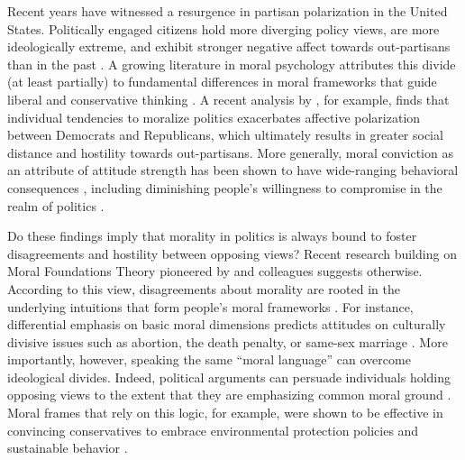 Recent years have witnessed a resurgence in partisan polarization in the United States. Politically engaged citizens hold more diverging policy
views, are more ideologically extreme, and exhibit stronger negative affect towards out-partisans than in the past \citep{hetherington2001resurgent, abramowitz2008polarization, iyengar2012affect, mason2014disrespectfully, huddy2015expressive, iyengar2015fear}. A growing literature in moral psychology attributes this divide (at least partially) to fundamental differences in moral frameworks that guide liberal and conservative thinking \citep[e.g.,][]{haidt2012righteous,graham2013moral}. A recent analysis by \citet{garrett2018moral}, for example, finds that individual tendencies to moralize politics exacerbates affective polarization between Democrats and Republicans, which ultimately results in greater social distance and hostility towards out-partisans. More generally, moral conviction as an attribute of attitude strength has been shown to have wide-ranging behavioral consequences \citep{skitka2005moral,skitka2014social}, including diminishing people's willingness to compromise in the realm of politics \citep{ryan2014reconsidering,ryan2017no}.

Do these findings imply that morality in politics is always bound to foster disagreements and hostility between opposing views? Recent research building on Moral Foundations Theory pioneered by \citet{haidt2007new} and colleagues suggests otherwise. According to this view, disagreements about morality are rooted in the underlying intuitions that form people's moral frameworks \citep{haidt2012righteous}. For instance, differential emphasis on basic moral dimensions predicts attitudes on culturally divisive issues such as abortion, the death penalty, or same-sex marriage \citep{koleva2012tracing}. More importantly, however, speaking the same ``moral language'' can overcome ideological divides. Indeed, political arguments can persuade individuals holding opposing views to the extent that they are emphasizing common moral ground \citep[e.g.,][]{day2014shifting,feinberg2015gulf}. Moral frames that rely on this logic, for example, were shown to be effective in convincing conservatives to embrace environmental protection policies and sustainable behavior \citep{kidwell2013getting,feinberg2013moral}.


